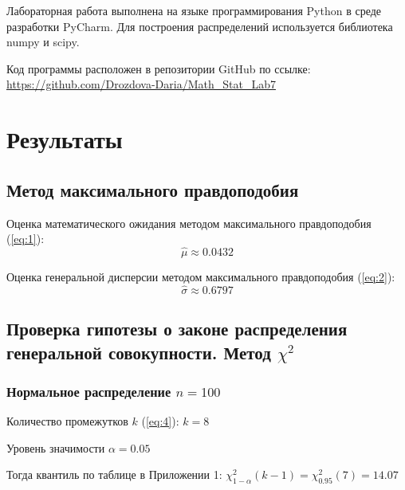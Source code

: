 \documentclass[a4paper, 12pt]{article}
\begin{document}
Лабораторная работа выполнена на языке программирования Python в среде разработки PyCharm. Для построения распределений используется библиотека numpy и scipy.

Код программы расположен в репозитории GitHub по ссылке: \url{https://github.com/Drozdova-Daria/Math_Stat_Lab7}

\newpage
\section{Результаты}

\subsection{Метод максимального правдоподобия}

Оценка математического ожидания методом максимального правдоподобия (\ref{eq:1}):
$$
\widehat{\mu} \approx 0.0432
$$

Оценка генеральной дисперсии методом максимального правдоподобия (\ref{eq:2}):
$$
\widehat{\sigma} \approx 0.6797
$$

\subsection{Проверка гипотезы о законе распределения генеральной совокупности. Метод $\chi^2$}

\subsubsection{Нормальное распределение $n=100$}
Количество промежутков $k$ (\ref{eq:4}): $k = 8$

Уровень значимости $\alpha = 0.05$

Тогда квантиль по таблице в Приложении 1: $\chi^2_{1-\alpha}(k-1) = \chi^2_0.95(7) = 14.07$
\end{document}
